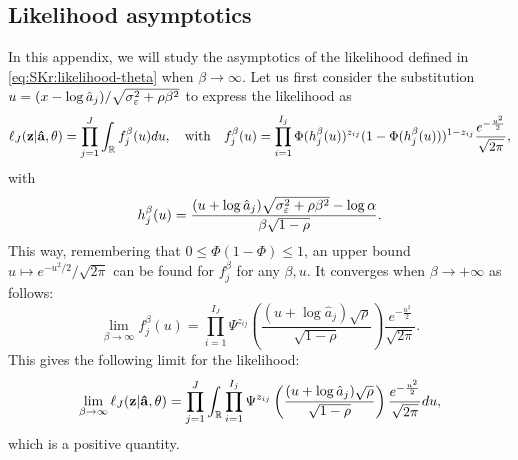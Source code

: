 \subsection{Likelihood asymptotics}
\label{subapp:C2}
    In this appendix, we will study the asymptotics of the likelihood defined in \cref{eq:SKr:likelihood-theta} when $\beta\to\infty$.
    Let us first consider the substitution $u=(x-\log\hat a_j)/\sqrt{\sigma_\varepsilon^2+\rho\beta^2}$ to express the likelihood as
    \begin{equation}
        \ell_J(\mathbf{z} | \mathbf{\hat a}, \theta) = \prod_{j=1}^J\int_{\mathbb{R}} f_{j}^\beta(u)du,
        \quad\text{with}\quad
        f_{j}^\beta(u) = \prod_{i=1}^{I_j}\Phi(h_j^\beta(u))^{z_{ij}}(1-\Phi(h_j^\beta(u)))^{1-z_{ij}} \frac{e^{-\frac{u^2}{2}}}{\sqrt{2\pi}} ,
    \end{equation}
    with 
    \begin{equation}
        h_j^\beta(u) = \frac{(u+\log\hat a_j)\sqrt{\sigma_\varepsilon^2+\rho\beta^2}-\log\alpha}{\beta\sqrt{1-\rho}}.
    \end{equation}
    This way, remembering that $0\leq\Phi(1-\Phi)\leq1$, an upper bound $u\mapsto e^{-u^2/2}/\sqrt{2\pi}$ can be found for $f_{j}^\beta$ for any $\beta,u$. It converges when $\beta \to +\infty$ as follows:
        \begin{equation}
            \lim_{\beta\rightarrow\infty} f_{j}^\beta(u)%
                = \prod_{i=1}^{I_J}%
                \Psi^{z_{ij}}\left(\frac{(u+\log\hat a_j)\sqrt{\rho}}{\sqrt{1-\rho}}\right)
                \frac{e^{-\frac{u^2}{2}}}{\sqrt{2\pi}}.
        \end{equation}
    This gives the following limit for the likelihood:
        \begin{equation}\label{eq:SKr:limitlik}
            \lim_{\beta\rightarrow\infty}\ell_J(\mbf z | \mbf{\hat a}, \theta)
                = \prod_{j=1}^J\int_\RR \prod_{i=1}^{I_j}%
                \Psi^{z_{ij}}\left(\frac{(u+\log\hat a_j)\sqrt{\rho}}{\sqrt{1-\rho}}\right)
                \frac{e^{-\frac{u^2}{2}}}{\sqrt{2\pi}}du ,
        \end{equation}
    which is a positive quantity.


